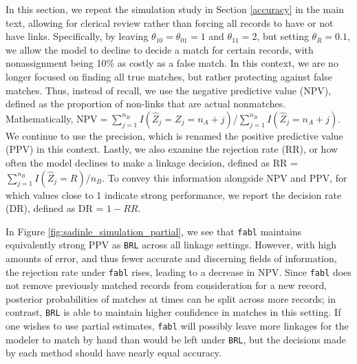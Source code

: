 \documentclass[ba,preprint]{imsart}
\begin{document}
In this section, we repeat the simulation study in Section \ref{accuracy} in the main text, allowing for clerical review rather than forcing all records to have or not have links.  Specifically, by leaving $\theta_{10} = \theta_{01} = 1$ and $\theta_{11} = 2$, but setting $\theta_R = 0.1$, we allow the model to decline to decide a match for certain records, with nonassignment being 10\% as costly as a false match. In this context, we are no longer focused on finding all true matches, but rather protecting against false matches. Thus, instead of recall, we use the negative predictive value (NPV), defined as the proportion of non-links that are actual nonmatches. Mathematically, $\text{NPV} = \sum_{j=1}^{n_B} I(\hat{Z}_j = Z_j = n_A + j)$/$\sum_{j=1}^{n_B} I(\hat{Z}_j = n_A + j)$. We continue to use the precision, which is renamed the positive predictive value (PPV) in this context. Lastly, we also examine the rejection rate (RR), or how often the model declines to make a linkage decision, defined as RR = $\sum_{j=1}^{n_B} I(\hat{Z}_j = R)/n_B$. To convey this information alongside NPV and PPV, for which values close to 1 indicate strong performance, we report the decision rate (DR), defined as DR = $1 - RR$.

In Figure \ref{fig:sadinle_simulation_partial}, we see that \texttt{fabl} maintains equivalently strong PPV as \texttt{BRL} across all linkage settings. However, with high amounts of error, and thus fewer accurate and discerning fields of information, the rejection rate under \texttt{fabl} rises, leading to a decrease in NPV. Since \texttt{fabl} does not remove previously matched records from consideration for a new record, posterior probabilities of matches at times can be split across more records; in contrast, \texttt{BRL} is able to maintain higher confidence in matches in this setting. If one wishes to use partial estimates, \texttt{fabl} will possibly leave more linkages for the modeler to match by hand than would be left under \texttt{BRL}, but the decisions made by each method should have nearly equal accuracy. 
\end{document}
